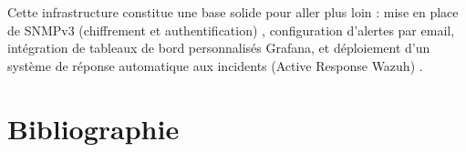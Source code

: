 \documentclass[a4paper,12pt,openany,oneside]{article}
\begin{document}

Cette infrastructure constitue une base solide pour aller plus loin : mise en place de SNMPv3 (chiffrement et authentification) \cite{snmp_rfc}, configuration d'alertes par email, intégration de tableaux de bord personnalisés Grafana, et déploiement d'un système de réponse automatique aux incidents (Active Response Wazuh) \cite{wazuh_bruteforce}.

\newpage

\section*{Bibliographie}
\nocite{*}
\printbibliography[heading=none]

\ClotureRapport
\end{document}

